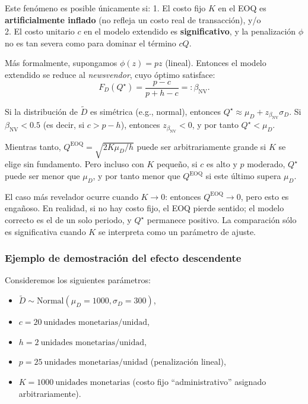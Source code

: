 \documentclass[
  spanish,
  us-letterpaper,
]{scrreprt}
\providecommand{\tightlist}{%
  \setlength{\itemsep}{0pt}\setlength{\parskip}{0pt}}
\numberwithin{equation}{section}
\begin{document}
Este fenómeno es posible únicamente si: 1. El costo fijo \(K\) en el EOQ
es \textbf{artificialmente inflado} (no refleja un costo real de
transacción), y/o\\
2. El costo unitario \(c\) en el modelo extendido es
\textbf{significativo}, y la penalización \(\phi\) no es tan severa como
para dominar el término \(c Q\).

Más formalmente, supongamos \(\phi(z) = p z\) (lineal). Entonces el
modelo extendido se reduce al \emph{newsvendor}, cuyo óptimo satisface:
\[
F_D(Q^\star) = \frac{p - c}{p + h - c} =: \beta_{\text{NV}}.
\]

Si la distribución de \(\tilde{D}\) es simétrica (e.g., normal),
entonces \(Q^\star \approx \mu_D + z_{\beta_{\text{NV}}} \sigma_D\). Si
\(\beta_{\text{NV}} < 0.5\) (es decir, si \(c > p - h\)), entonces
\(z_{\beta_{\text{NV}}} < 0\), y por tanto \(Q^\star < \mu_D\).

Mientras tanto, \(Q^{\text{EOQ}} = \sqrt{2 K \mu_D / h}\) puede ser
arbitrariamente grande si \(K\) se elige sin fundamento. Pero incluso
con \(K\) pequeño, si \(c\) es alto y \(p\) moderado, \(Q^\star\) puede
ser menor que \(\mu_D\), y por tanto menor que \(Q^{\text{EOQ}}\) si
este último supera \(\mu_D\).

El caso más revelador ocurre cuando \textbf{\(K \to 0\)}: entonces
\(Q^{\text{EOQ}} \to 0\), pero esto es engañoso. En realidad, si no hay
costo fijo, el EOQ pierde sentido; el modelo correcto es el de un solo
periodo, y \(Q^\star\) permanece positivo. La comparación sólo es
significativa cuando \(K\) se interpreta como un parámetro de ajuste.

\subsubsection{Ejemplo de demostración del efecto
descendente}\label{ejemplo-de-demostraciuxf3n-del-efecto-descendente}

Consideremos los siguientes parámetros:

\begin{itemize}
\tightlist
\item
  \(\tilde{D} \sim \text{Normal}(\mu_D = 1000, \sigma_D = 300)\),
\item
  \(c = 20~\text{unidades monetarias/unidad}\),
\item
  \(h = 2~\text{unidades monetarias/unidad}\),
\item
  \(p = 25~\text{unidades monetarias/unidad}\) (penalización lineal),
\item
  \(K = 1000~\text{unidades monetarias}\) (costo fijo ``administrativo''
  asignado arbitrariamente).
\end{itemize}
\end{document}
